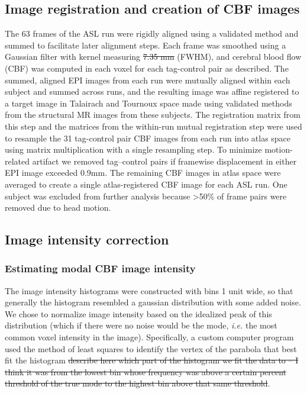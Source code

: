 \subsection{Image registration and creation of CBF images}
The 63 frames of the ASL run were rigidly aligned using a validated method\cite{Black_2001} and summed to facilitate later alignment steps. Each frame was smoothed using a Gaussian filter with kernel measuring \sout{7.35 mm} (FWHM), and cerebral blood flow (CBF) was computed in each voxel for each tag-control pair as described.\cite{Wang_2003} The summed, aligned EPI images from each run were mutually aligned within each subject and summed across runs, and the resulting image was affine registered to a target image in Talairach and Tournoux space made using validated methods from the structural MR images from these subjects.\cite{15130735} The registration matrix from this step and the matrices from the within-run mutual registration step were used to resample the 31 tag-control pair CBF images from each run into atlas space using matrix multiplication with a single resampling step. To minimize motion-related artifact we removed tag--control pairs if framewise displacement in either EPI image exceeded 0.9mm.\cite{23861343} The remaining CBF images in atlas space were averaged to create a single atlas-registered CBF image for each ASL run. One subject was excluded from further analysis because >50\% of frame pairs were removed due to head motion.

\subsection{Image intensity correction}
\subsubsection{Estimating modal CBF image intensity}
The image intensity histograms were constructed with bins 1 unit wide, so that generally the histogram resembled a gaussian distribution with some added noise. We chose to normalize image intensity based on the idealized peak of this distribution (which if there were no noise would be the mode, \textit{i.e.} the most common voxel intensity in the image).\cite{Ojemann_1997} Specifically, a custom computer program used the method of least squares to identify the vertex of the parabola that best fit the histogram \sout{describe here which part of the histogram we fit the data to -- I think it was from the lowest bin whose frequency was above a certain percent threshold of the true mode to the highest bin above that same threshold}.

